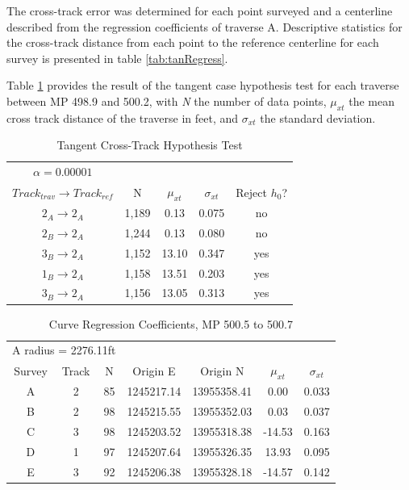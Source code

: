The cross-track error was determined for each point surveyed and a centerline described from the regression coefficients of traverse A. Descriptive statistics for the cross-track distance from each point to the reference centerline for each survey is presented in table \ref{tab:tanRegress}.

Table \ref{tab:tanHypo} provides the result of the tangent case hypothesis test for each traverse between MP 498.9 and 500.2, with \emph{N} the number of data points, $\mu_{xt}$ the mean cross track distance of the traverse in feet, and ${\sigma_{xt}}$ the standard deviation.

\begin{table}[!h]
	\begin{center}
	\caption{Tangent Cross-Track Hypothesis Test}
	\label{tab:tanHypo}
		\begin{tabular}{c c c c c }
\toprule
{$\alpha = 0.00001$} & & & &\\
	$Track_{trav}\rightarrow Track_{ref}$ & N   & ${\mu_{xt}}$ & ${\sigma_{xt}}$ & Reject ${h_0}$?  \\
\midrule
	 $2_A\rightarrow2_A$ & 1,189   & 0.13  & 0.075   & no \\
	 $2_B\rightarrow2_A$ & 1,244   & 0.13  &  0.080  & no \\
	 $3_B\rightarrow2_A$ & 1,152   & 13.10    &  0.347  & yes \\
	 $1_B\rightarrow2_A$ & 1,158   & 13.51    &  0.203  & yes \\
	 $3_B\rightarrow2_A$ & 1,156   & 13.05    & 0.313   & yes \\
\bottomrule
	\end{tabular}
	\end{center}
\end{table}
	
\begin{table}[!h]
	\begin{center}
	\caption{Curve Regression Coefficients, MP 500.5 to 500.7}
	\label{tab:crvRegress}
		\begin{tabular}{c c c c c c c}
\toprule
\multicolumn{3}{l}{A radius = 2276.11ft} \\
	Survey & Track & N  & Origin E  & Origin N & ${\mu_{xt}}$ & ${\sigma_{xt}}$\\
\midrule
	A & 2 & 85 & 1245217.14 & 13955358.41 & 0.00 & 0.033 \\
	B & 2 & 98 & 1245215.55 & 13955352.03 & 0.03  & 0.037 \\
	C & 3 & 98 & 1245203.52 & 13955318.38 & -14.53   & 0.163 \\
	D & 1 & 97 & 1245207.64 & 13955326.35 & 13.93    & 0.095 \\
	E & 3 & 92 & 1245206.38 & 13955328.18 & -14.57   & 0.142 \\
	\bottomrule
	\end{tabular}
	\end{center}
\end{table}

